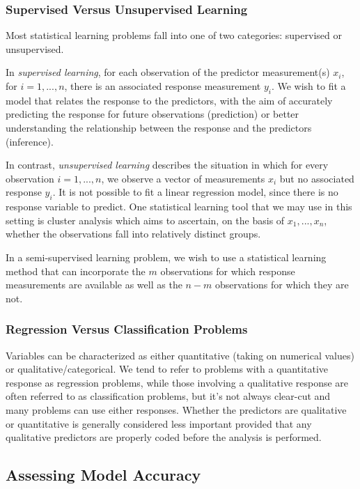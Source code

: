 \documentclass{article}
\numberwithin{equation}{section}
\begin{document}
\subsubsection{Supervised Versus Unsupervised Learning}
Most statistical learning problems fall into one of two categories: supervised or unsupervised.

In \textit{supervised learning}, for each observation of the predictor measurement(s) $x_i$, for $ i = 1,...,n$, there is an associated response measurement $y_i$. We wish to fit a model that relates the response to the predictors, with the aim of accurately predicting the response for future
observations (prediction) or better understanding the relationship between the response and the predictors (inference).

In contrast, \textit{unsupervised learning} describes the situation in which for every observation $i = 1,...,n$, we observe a vector of measurements $x_i$ but no associated response $y_i$. It is not possible to fit a linear regression model, since there is no response variable to predict.  One statistical learning tool that we may use in this setting is cluster analysis which aims to ascertain, on the basis of $x_1,..., x_n$, whether the observations fall into relatively distinct groups.

In a semi-supervised learning problem, we wish to use a statistical learning method that can incorporate the $m$ observations for which response measurements are available as well as the $n - m$ observations for which they are not. 

\subsubsection{Regression Versus Classification Problems}
Variables can be characterized as either quantitative (taking on numerical values) or qualitative/categorical. We tend to refer to problems with a quantitative response as regression problems, while those involving a qualitative response are often referred to as classification problems, but it's not always clear-cut and many problems can use either responses. Whether the predictors are qualitative or quantitative is generally considered less important provided that any qualitative predictors are properly coded before the analysis is
performed.

\subsection{Assessing Model Accuracy}
\end{document}
